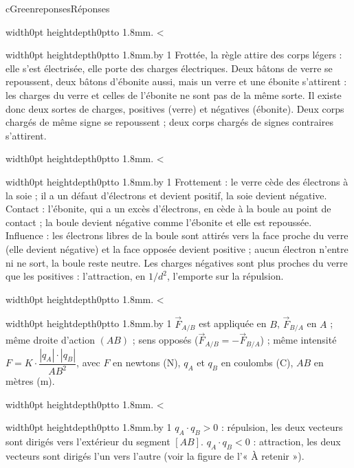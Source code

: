 \documentclass[11pt,a4paper]{article}
\newcommand{\vect}[1]{\overrightarrow{#1}}
\newif\ifeleve
\newlength{\interligne}\setlength{\interligne}{7mm}
\newlength{\replen}
\newcommand{\pointilles}{{\color{cInk2!60}\leaders\hbox to 1.8mm{\hss.\hss}\hfill}\kern0pt}
\newcommand{\lignes}[1]{\leavevmode\vrule width0pt height\dimexpr\interligne-1mm\relax depth0pt\pointilles
  \lgn=1 \loop\ifnum\lgn<#1 \par\nointerlineskip\noindent\vrule width0pt height\interligne depth0pt\pointilles\advance\lgn by 1 \repeat}
\newcommand{\rep}[1]{%
  \ifeleve
    \sbox{\repbox}{\parbox{\linewidth}{#1}}%
    \replen=\dimexpr\ht\repbox+\dp\repbox\relax
    \repn=\numexpr\replen/\baselineskip+1\relax
    \ifnum\repn<2 \repn=2\fi
    \edef\nblignes{\the\repn}\lignes{\nblignes}%
  \else #1\fi}
\newcommand{\titrereponses}{\ifeleve Mes réponses\else Réponses\fi}
\begin{document}
\begin{rub}{cGreen}{reponses}{\titrereponses}
\begin{reps}
  \item \rep{Frottée, la règle attire des corps légers : elle s’est électrisée, elle porte des charges électriques. Deux bâtons de verre se repoussent, deux bâtons d’ébonite aussi, mais un verre et une ébonite s’attirent : les charges du verre et celles de l’ébonite ne sont pas de la même sorte. Il existe donc deux sortes de charges, positives (verre) et négatives (ébonite). Deux corps chargés de même signe se repoussent ; deux corps chargés de signes contraires s’attirent.}
  \item \rep{Frottement : le verre cède des électrons à la soie ; il a un défaut d’électrons et devient positif, la soie devient négative. Contact : l’ébonite, qui a un excès d’électrons, en cède à la boule au point de contact ; la boule devient négative comme l’ébonite et elle est repoussée. Influence : les électrons libres de la boule sont attirés vers la face proche du verre (elle devient négative) et la face opposée devient positive ; aucun électron n’entre ni ne sort, la boule reste neutre. Les charges négatives sont plus proches du verre que les positives : l’attraction, en $1/d^2$, l’emporte sur la répulsion.}
  \item \rep{$\vect{F}_{A/B}$ est appliquée en $B$, $\vect{F}_{B/A}$ en $A$ ; même droite d’action $(AB)$ ; sens opposés ($\vect{F}_{A/B} = -\vect{F}_{B/A}$) ; même intensité $F = K\cdot\dfrac{|q_A|\cdot|q_B|}{AB^2}$, avec $F$ en newtons (N), $q_A$ et $q_B$ en coulombs (C), $AB$ en mètres (m).}
  \item \rep{$q_A\cdot q_B > 0$ : répulsion, les deux vecteurs sont dirigés vers l’extérieur du segment $[AB]$. $q_A\cdot q_B < 0$ : attraction, les deux vecteurs sont dirigés l’un vers l’autre (voir la figure de l’« À retenir »).}
\end{reps}
\end{rub}
\end{document}
